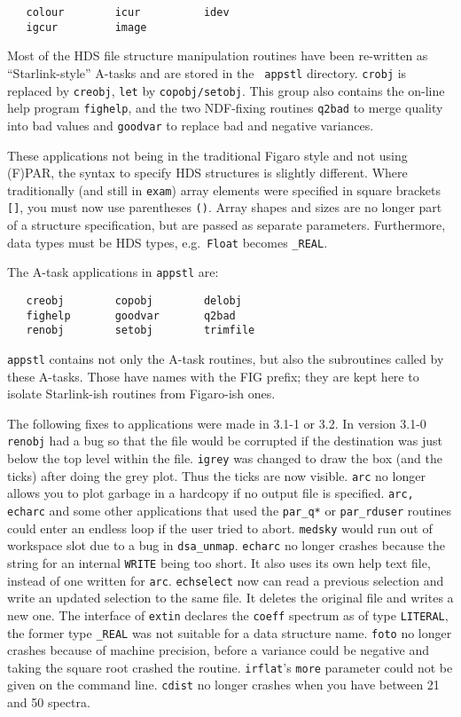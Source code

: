 \begin{verbatim}
   colour        icur          idev     
   igcur         image
\end{verbatim}

Most of the HDS file structure manipulation routines have been
re-written as ``Starlink-style'' A-tasks and are stored in the {\tt
appstl} directory. {\tt crobj} is replaced by {\tt creobj}, {\tt let} by
{\tt copobj/setobj}.  This group also contains the on-line
help program {\tt fighelp}, and the two NDF-fixing routines {\tt q2bad}
to merge quality into bad values and {\tt goodvar} to replace bad and
negative variances.

These applications not being in the traditional Figaro style and not
using (F)PAR, the syntax to specify HDS structures is slightly
different.  Where traditionally (and still in {\tt exam}) array elements
were specified in square brackets {\tt []}, you must now use parentheses
{\tt ()}.
Array shapes and sizes are no longer part of a structure specification,
but are passed as separate parameters.  Furthermore, data types must be
HDS types, e.g.\ {\tt Float} becomes {\tt \_REAL}.

The A-task applications in {\tt appstl} are:

\begin{verbatim}
   creobj        copobj        delobj   
   fighelp       goodvar       q2bad    
   renobj        setobj        trimfile
\end{verbatim}

{\tt appstl} contains not only the A-task routines, but also the
subroutines called by these A-tasks. Those have names with the FIG
prefix; they are kept here to isolate Starlink-ish routines from
Figaro-ish ones.

The following fixes to applications
were made in 3.1-1 or 3.2.
In version 3.1-0 {\tt renobj} had a bug so that the file would be
corrupted if the destination was just below the top level within the file.
{\tt igrey} was changed to draw the box (and the ticks) after doing the
grey plot. Thus the ticks are now visible.
{\tt arc} no longer allows you to plot garbage in a hardcopy if no output
file is specified.
{\tt arc, echarc} and some other applications that used the
{\tt par\_q*} or {\tt par\_rduser} routines could enter an endless loop if the
user tried to abort.
{\tt medsky} would run out of workspace slot due to a bug in {\tt dsa\_unmap}.
{\tt echarc} no longer crashes because the string for an internal
{\tt WRITE} being too short.  It also uses its own help text file,
instead of one written
for {\tt arc}.
{\tt echselect} now can read a previous selection and write an updated
selection to the same file.  It deletes the original file and writes a
new one.
The interface of {\tt extin} declares the {\tt coeff} spectrum as of
type {\tt LITERAL}, the former type {\tt \_REAL} was not suitable for a
data structure name.
{\tt foto} no longer crashes because of machine
precision, before a variance could be negative and taking the square root
crashed the routine.
{\tt irflat}'s {\tt more} parameter could not be given on the command
line.
{\tt cdist} no longer crashes when you have between 21 and 50 spectra.


